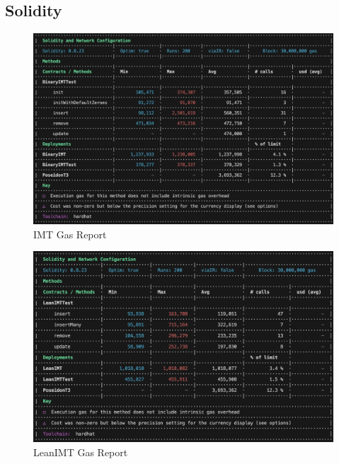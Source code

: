 \documentclass{article}
\begin{document}
\subsection{Solidity}

\begin{figure}[H]
    \centering
    \includegraphics[width=\textwidth]{images/imt-gas-report.png}
    \caption{IMT Gas Report}
    \label{fig:imt-gas-report}
\end{figure}

\begin{figure}[H]
    \centering
    \includegraphics[width=\textwidth]{images/leanimt-gas-report.png}
    \caption{LeanIMT Gas Report}
    \label{fig:leanimt-gas-report}
\end{figure}

\end{document}
